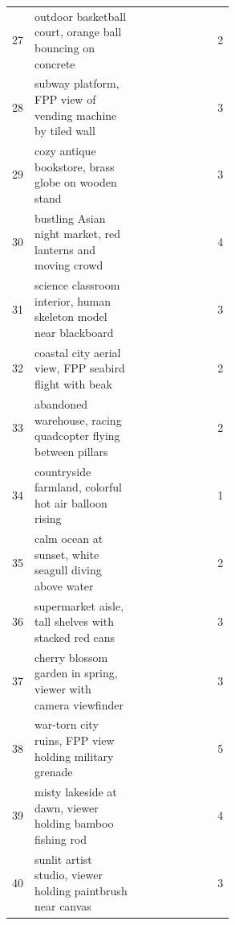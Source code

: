 \documentclass{llmxive}
\providecommand{\cmark}{\ding{51}}
\providecommand{\xmark}{\ding{55}}
\begin{document}
\begin{table}[!htbp]
\begin{tabular}{@{}l p{0.55\linewidth} ccccccc c@{}}
27  & outdoor basketball court, orange ball bouncing on concrete            & \xmark & \cmark & \xmark & \xmark & \xmark & \cmark & \xmark & 2 \\
28  & subway platform, FPP view of vending machine by tiled wall             & \xmark & \cmark & \xmark & \xmark & \xmark & \cmark & \cmark & 3 \\
29  & cozy antique bookstore, brass globe on wooden stand                   & \xmark & \cmark & \xmark & \xmark & \xmark & \cmark & \cmark & 3 \\
30  & bustling Asian night market, red lanterns and moving crowd            & \cmark & \cmark & \xmark & \xmark & \xmark & \cmark & \cmark & 4 \\
31  & science classroom interior, human skeleton model near blackboard      & \xmark & \cmark & \xmark & \xmark & \xmark & \cmark & \cmark & 3 \\
32  & coastal city aerial view, FPP seabird flight with beak                 & \cmark & \cmark & \xmark & \xmark & \xmark & \xmark & \xmark & 2 \\
33  & abandoned warehouse, racing quadcopter flying between pillars         & \xmark & \cmark & \xmark & \xmark & \xmark & \cmark & \xmark & 2 \\
34  & countryside farmland, colorful hot air balloon rising                 & \xmark & \xmark & \xmark & \xmark & \xmark & \xmark & \cmark & 1 \\
35  & calm ocean at sunset, white seagull diving above water                & \cmark & \xmark & \xmark & \xmark & \xmark & \cmark & \xmark & 2 \\
36  & supermarket aisle, tall shelves with stacked red cans                 & \xmark & \cmark & \xmark & \xmark & \xmark & \cmark & \cmark & 3 \\
37  & cherry blossom garden in spring, viewer with camera viewfinder        & \xmark & \cmark & \xmark & \xmark & \cmark & \xmark & \cmark & 3 \\
38  & war-torn city ruins, FPP view holding military grenade                 & \cmark & \cmark & \xmark & \cmark & \cmark & \xmark & \cmark & 5 \\
39  & misty lakeside at dawn, viewer holding bamboo fishing rod             & \cmark & \cmark & \xmark & \xmark & \xmark & \cmark & \cmark & 4 \\
40  & sunlit artist studio, viewer holding paintbrush near canvas           & \xmark & \cmark & \xmark & \xmark & \xmark & \cmark & \cmark & 3 \\

\end{tabular}
\end{table}
\end{document}
